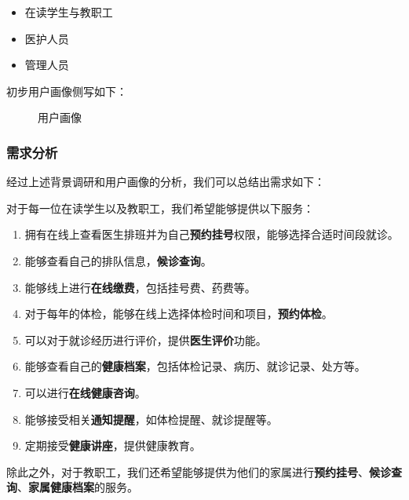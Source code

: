 \documentclass{article}
\begin{document}
\begin{itemize}[itemsep=0.01em]
    \item 在读学生与教职工
    \item 医护人员
    \item 管理人员
\end{itemize}

初步用户画像侧写如下：

\begin{figure}[h]
    \centering
    \caption{用户画像}
\end{figure}

\subsubsection{需求分析}

经过上述背景调研和用户画像的分析，我们可以总结出需求如下：
\vspace{0.5cm}

对于每一位在读学生以及教职工，我们希望能够提供以下服务：
\begin{enumerate}[itemsep=0.01em]
    \item 拥有在线上查看医生排班并为自己\textbf{预约挂号}权限，能够选择合适时间段就诊。
    \item 能够查看自己的排队信息，\textbf{候诊查询}。
    \item 
    能够线上进行\textbf{在线缴费}，包括挂号费、药费等。
    \item 对于每年的体检，能够在线上选择体检时间和项目，\textbf{预约体检}。
    \item 可以对于就诊经历进行评价，提供\textbf{医生评价}功能。
    \item 能够查看自己的\textbf{健康档案}，包括体检记录、病历、就诊记录、处方等。
    \item 可以进行\textbf{在线健康咨询}。
    \item 能够接受相关\textbf{通知提醒}，如体检提醒、就诊提醒等。
    \item 定期接受\textbf{健康讲座}，提供健康教育。
\end{enumerate}

除此之外，对于教职工，我们还希望能够提供为他们的家属进行\textbf{预约挂号}、\textbf{候诊查询}、\textbf{家属健康档案}的服务。
\end{document}
